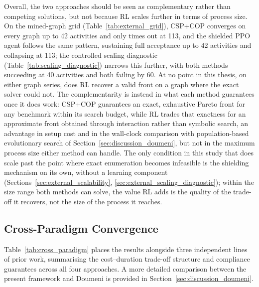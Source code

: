 Overall, the two approaches should be seen as complementary rather than competing solutions, but not because \ac{RL} scales further in terms of process size. On the mined-graph grid (Table~\ref{tab:external_grid}), CSP+COP converges on every graph up to 42 activities and only times out at 113, and the shielded \ac{PPO} agent follows the same pattern, sustaining full acceptance up to 42 activities and collapsing at 113; the controlled scaling diagnostic (Table~\ref{tab:scaling_diagnostic}) narrows this further, with both methods succeeding at 40 activities and both failing by 60. At no point in this thesis, on either graph series, does \ac{RL} recover a valid front on a graph where the exact solver could not. The complementarity is instead in what each method guarantees once it does work: CSP+COP guarantees an exact, exhaustive Pareto front for any benchmark within its search budget, while \ac{RL} trades that exactness for an approximate front obtained through interaction rather than symbolic search, an advantage in setup cost and in the wall-clock comparison with population-based evolutionary search of Section~\ref{sec:discussion_doumeni}, but not in the maximum process size either method can handle. The only condition in this study that does scale past the point where exact enumeration becomes infeasible is the shielding mechanism on its own, without a learning component (Sections~\ref{sec:external_scalability}, \ref{sec:external_scaling_diagnostic}); within the size range both methods can solve, the value \ac{RL} adds is the quality of the trade-off it recovers, not the size of the process it reaches.

\subsection{Cross-Paradigm Convergence}
\label{sec:discussion_cross_paradigm}

Table~\ref{tab:cross_paradigm} places the results alongside three independent lines of prior work, summarising the cost--duration trade-off structure and compliance guarantees across all four approaches. A more detailed comparison between the present framework and Doumeni is provided in Section~\ref{sec:discussion_doumeni}.

